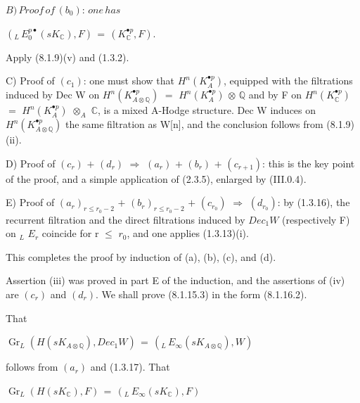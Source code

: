 \documentclass[11pt,twoside]{article}
\newcommand{\DFormula}[1]{%
  \par\smallskip\noindent\hspace*{0pt}\(\displaystyle #1\)\par\smallskip
}
\begin{document}
\DFormula{B)\,Proof\,of\,(b_{0}):\,one\,has}
\par\medskip
\DFormula{(_{L}\,E_{0}^{p\bullet }(sK_{\mathbb{C}}),F)\,=\,(K_{\mathbb{C}}^{\bullet p},F).}
\par\medskip
Apply (8.1.9)(v) and (1.3.2).\par
\par\medskip
C) Proof of \((c_{1})\): one must show that \(H^{n}(K_{A}^{\bullet p})\), equipped with the filtrations induced by Dec W on \(H^{n}(K_{A\otimes \mathbb{Q}}^{\bullet p})\) \(=\) \(H^{n}(K_{A}^{\bullet p})\) \(\otimes \) \(\mathbb{Q}\) and by F on \(H^{n}(K_{\mathbb{C}}^{\bullet p})\) \(=\) \(H^{n}(K_{A}^{\bullet p})\) \(\otimes _{A}\) \(\mathbb{C}\), is a mixed A-Hodge structure. Dec W induces on \(H^{n}(K_{A\otimes \mathbb{Q}}^{\bullet p})\) the same filtration as W[n], and the conclusion follows from (8.1.9)(ii).\par
\par\medskip
D) Proof of \((c_{r})\) \(+\) \((d_{r})\) \(\Rightarrow \) \((a_{r})\) \(+\) \((b_{r})\) \(+\) \((c_{r+1})\): this is the key point of the proof, and a simple application of (2.3.5), enlarged by (III.0.4).\par
\par\medskip
E) Proof of \((a_{r})_{r\leq r_{0}−2}\) \(+\) \((b_{r})_{r\leq r_{0}−2}\) \(+\) \((c_{r_{0}})\) \(\Rightarrow \) \((d_{r_{0}})\): by (1.3.16), the recurrent filtration and the direct filtrations induced by \(Dec_{1}W\) (respectively F) on \(_{L}\) \(E_{r}\) coincide for r \(\leq \) \(r_{0}\), and one applies (1.3.13)(i).\par
\par\medskip
This completes the proof by induction of (a), (b), (c), and (d).\par
\par\medskip
Assertion (iii) was proved in part E of the induction, and the assertions of (iv) are \((c_{r})\) and \((d_{r})\). We shall prove (8.1.15.3) in the form (8.1.16.2).\par
\par\medskip
That\par
\par\medskip
\DFormula{\operatorname{Gr}_{L}(H(sK_{A\otimes \mathbb{Q}}),Dec_{1}W)\,=\,(_{L}\,E_{\infty }(sK_{A\otimes \mathbb{Q}}),W)}
\par\medskip
follows from \((a_{r})\) and (1.3.17). That\par
\par\medskip
\DFormula{\operatorname{Gr}_{L}(H(sK_{\mathbb{C}}),F)\,=\,(_{L}\,E_{\infty }(sK_{\mathbb{C}}),F)}
\end{document}

